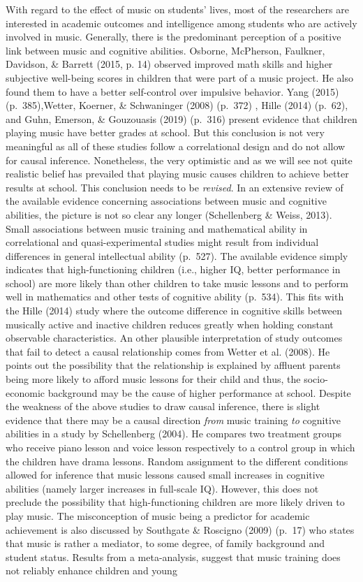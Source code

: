 \documentclass[a4, 12pt]{article}
\begin{document}
\label{ch:roleofmusic}
With regard to the effect of music on students' lives, most of the researchers are interested in academic outcomes and intelligence among students who are actively involved in music. Generally, there is the predominant perception of a positive link between music and cognitive abilities. Osborne, McPherson, Faulkner, Davidson, \& Barrett (2015, p. 14) observed improved math skills and higher subjective well-being scores in children that were part of a music project. He also found them to have a better self-control over impulsive behavior. Yang (2015) (p.~385),Wetter, Koerner, \& Schwaninger (2008) (p.~372) , Hille (2014) (p.~62), and Guhn, Emerson, \& Gouzouasis (2019) (p.~316) present evidence that children playing music have better grades at school. But this conclusion is not very meaningful as all of these studies follow a correlational design and do not allow for causal inference. Nonetheless, the very optimistic and as we will see not quite realistic belief has prevailed that playing music causes children to achieve better results at school. This conclusion needs to be \emph{revised}. In an extensive review of the available evidence concerning associations between music and cognitive abilities, the picture is not so clear any longer (Schellenberg \& Weiss, 2013). Small associations between music training and mathematical ability in correlational and quasi-experimental studies might result from individual differences in general intellectual ability (p.~527). The available evidence simply indicates that high-functioning children (i.e., higher IQ, better performance in school) are more likely than other children to take music lessons and to perform well in mathematics and other tests of cognitive ability (p.~534). This fits with the Hille (2014) study where the outcome difference in cognitive skills between musically active and inactive children reduces greatly when holding constant observable characteristics. An other plausible interpretation of study outcomes that fail to detect a causal relationship comes from Wetter et al. (2008). He points out the possibility that the relationship is explained by affluent parents being more likely to afford music lessons for their child and thus, the socio-economic background may be the cause of higher performance at school. Despite the weakness of the above studies to draw causal inference, there is slight evidence that there may be a causal direction \emph{from} music training \emph{to} cognitive abilities in a study by Schellenberg (2004). He compares two treatment groups who receive piano lesson and voice lesson respectively to a control group in which the children have drama lessons. Random assignment to the different conditions allowed for inference that music lessons caused small increases in cognitive abilities (namely larger increases in full-scale IQ). However, this does not preclude the possibility that high-functioning children are more likely driven to play music. The misconception of music being a predictor for academic achievement is also discussed by Southgate \& Roscigno (2009) (p.~17) who states that music is rather a mediator, to some degree, of family background and student status. Results from a meta-analysis, suggest that music training does not reliably enhance children and young 
\end{document}
